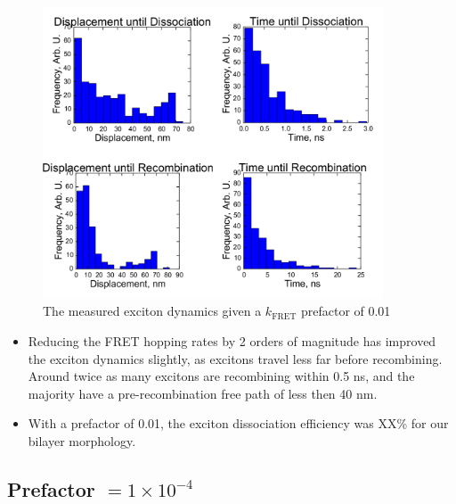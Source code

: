 \documentclass[12pt]{article}
\begin{document}
\begin{figure}[h!]\centering
	\includegraphics[width=0.9\textwidth]{Figures/prefactor01/prefactor01.pdf}
    \caption{The measured exciton dynamics given a $k_{\text{FRET}}$ prefactor of 0.01}
	\label{fig:noPrefactor}
\end{figure}

\begin{itemize}
    \item{Reducing the FRET hopping rates by 2 orders of magnitude has improved the exciton dynamics slightly, as excitons travel less far before recombining. Around twice as many excitons are recombining within 0.5 ns, and the majority have a pre-recombination free path of less then 40 nm.}
    \item{With a prefactor of 0.01, the exciton dissociation efficiency was XX\% for our bilayer morphology.}
\end{itemize}

\clearpage

\subsection{Prefactor $= 1 \times 10^{-4}$}
\end{document}
